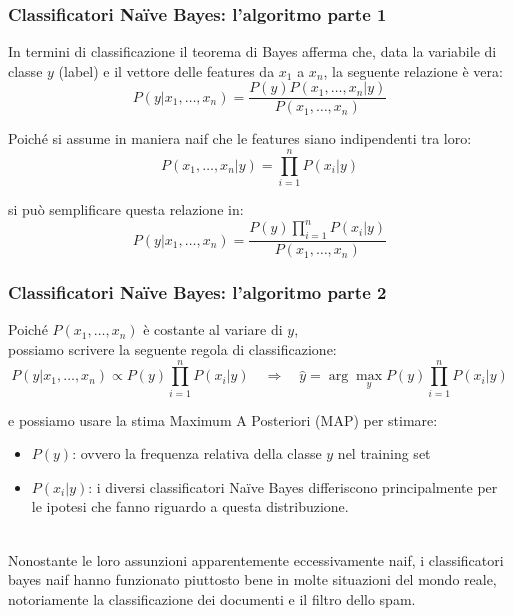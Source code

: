 \begin{frame}
	
	\frametitle{Classificatori Naïve Bayes: l'algoritmo parte 1}
	
	In termini di classificazione il teorema di Bayes afferma che, data la variabile di classe $y$ (label) e il vettore delle features da $x_1$ a $x_n$, la seguente relazione è vera:
	$$P(y \vert x_1, \dots, x_n) = \frac{P(y) P(x_1, \dots, x_n \vert y)}
                                 {P(x_1, \dots, x_n)}$$
                              
	Poiché si assume in maniera naif che le features siano indipendenti tra loro:
	$$P(x_1, \dots, x_n \vert y) = \prod_{i=1}^{n} P(x_i \vert y)$$
	
	si può semplificare questa relazione in:
	$$P(y \vert x_1, \dots, x_n) = \frac{P(y) \prod_{i=1}^{n} P(x_i \vert y)}
                                 {P(x_1, \dots, x_n)}$$
\end{frame}


\begin{frame}
	
	\frametitle{Classificatori Naïve Bayes: l'algoritmo parte 2}

	Poiché $P(x_1, \dots, x_n)$ è costante al variare di $y$,\\ possiamo scrivere la seguente regola di classificazione:
	$$P(y \vert x_1, \dots, x_n) \propto P(y) \prod_{i=1}^{n} P(x_i \vert y) \quad \Rightarrow \quad \hat{y} = \arg\max_y P(y) \prod_{i=1}^{n} P(x_i \vert y)$$

	e possiamo usare la stima Maximum A Posteriori (MAP) per stimare:
	\begin{itemize}
		\item $P(y)$: ovvero la frequenza relativa della classe $y$ nel training set
		\item $P(x_i \vert y)$: i diversi classificatori Naïve Bayes differiscono principalmente per le ipotesi che fanno riguardo a questa distribuzione.
	\end{itemize}
	\ \\
	Nonostante le loro assunzioni apparentemente eccessivamente naif, i classificatori bayes naif hanno funzionato piuttosto bene in molte situazioni del mondo reale, notoriamente la classificazione dei documenti e il filtro dello spam.
\end{frame}


